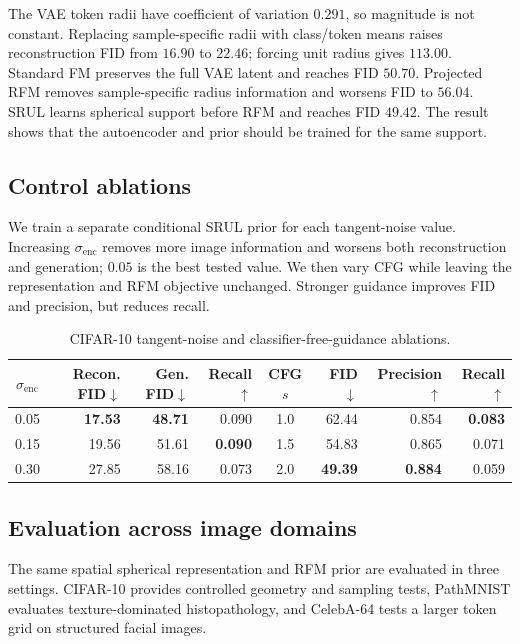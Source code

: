 \documentclass{article}
\begin{document}
The VAE token radii have coefficient of variation $0.291$, so magnitude is not constant. Replacing sample-specific radii with class/token means raises reconstruction FID from $16.90$ to $22.46$; forcing unit radius gives $113.00$. Standard FM preserves the full VAE latent and reaches FID $50.70$. Projected RFM removes sample-specific radius information and worsens FID to $56.04$. SRUL learns spherical support before RFM and reaches FID $49.42$. The result shows that the autoencoder and prior should be trained for the same support.

\subsection*{Control ablations}
We train a separate conditional SRUL prior for each tangent-noise value. Increasing $\sigma_{\mathrm{enc}}$ removes more image information and worsens both reconstruction and generation; $0.05$ is the best tested value. We then vary CFG while leaving the representation and RFM objective unchanged. Stronger guidance improves FID and precision, but reduces recall.

\begin{table}[H]
\centering
\scriptsize
\caption{CIFAR-10 tangent-noise and classifier-free-guidance ablations.}
\label{tab:controls}
\setlength{\tabcolsep}{4.1pt}
\begin{tabular}{crrr|crrr}
\toprule
$\sigma_{\mathrm{enc}}$ & Recon. FID$\downarrow$ & Gen. FID$\downarrow$ & Recall$\uparrow$ & CFG $s$ & FID$\downarrow$ & Precision$\uparrow$ & Recall$\uparrow$ \\
\midrule
0.05 & \textbf{17.53} & \textbf{48.71} & 0.090 & 1.0 & 62.44 & 0.854 & \textbf{0.083} \\
0.15 & 19.56 & 51.61 & \textbf{0.090} & 1.5 & 54.83 & 0.865 & 0.071 \\
0.30 & 27.85 & 58.16 & 0.073 & 2.0 & \textbf{49.39} & \textbf{0.884} & 0.059 \\
\bottomrule
\end{tabular}
\end{table}

\subsection*{Evaluation across image domains}
The same spatial spherical representation and RFM prior are evaluated in three settings. CIFAR-10 provides controlled geometry and sampling tests, PathMNIST evaluates texture-dominated histopathology, and CelebA-64 tests a larger token grid on structured facial images.
\end{document}
